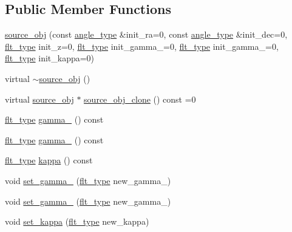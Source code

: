 \subsection*{Public Member Functions}
\begin{DoxyCompactItemize}
\item 
\hyperlink{classIceBRG_1_1source__obj_a595bf7e87ae2bc9f885ac69398dc7fd6}{source\+\_\+obj} (const \hyperlink{namespaceIceBRG_a688eeb0811a2474b20b667ed2e9625a1}{angle\+\_\+type} \&init\+\_\+ra=0, const \hyperlink{namespaceIceBRG_a688eeb0811a2474b20b667ed2e9625a1}{angle\+\_\+type} \&init\+\_\+dec=0, \hyperlink{lib_2IceBRG__main_2common_8h_ad0f130a56eeb944d9ef2692ee881ecc4}{flt\+\_\+type} init\+\_\+z=0, \hyperlink{lib_2IceBRG__main_2common_8h_ad0f130a56eeb944d9ef2692ee881ecc4}{flt\+\_\+type} init\+\_\+gamma\+\_=0, \hyperlink{lib_2IceBRG__main_2common_8h_ad0f130a56eeb944d9ef2692ee881ecc4}{flt\+\_\+type} init\+\_\+gamma\+\_=0, \hyperlink{lib_2IceBRG__main_2common_8h_ad0f130a56eeb944d9ef2692ee881ecc4}{flt\+\_\+type} init\+\_\+kappa=0)
\item 
virtual \hyperlink{classIceBRG_1_1source__obj_aefcc60368231b021fe8166f98311e1d6}{$\sim$source\+\_\+obj} ()
\item 
virtual \hyperlink{classIceBRG_1_1source__obj}{source\+\_\+obj} $\ast$ \hyperlink{classIceBRG_1_1source__obj_a0c5bd9f6b0fa086c18c3918fcc6a5fac}{source\+\_\+obj\+\_\+clone} () const  =0
\item 
\hyperlink{lib_2IceBRG__main_2common_8h_ad0f130a56eeb944d9ef2692ee881ecc4}{flt\+\_\+type} \hyperlink{classIceBRG_1_1source__obj_a3cac72eb3217867d24a80af6be00e253}{gamma\+\_} () const 
\item 
\hyperlink{lib_2IceBRG__main_2common_8h_ad0f130a56eeb944d9ef2692ee881ecc4}{flt\+\_\+type} \hyperlink{classIceBRG_1_1source__obj_a19792a6ae7f359962d3d4256c0b6482f}{gamma\+\_} () const 
\item 
\hyperlink{lib_2IceBRG__main_2common_8h_ad0f130a56eeb944d9ef2692ee881ecc4}{flt\+\_\+type} \hyperlink{classIceBRG_1_1source__obj_ab25974cd9f5cf78de04e4e8afa1256de}{kappa} () const 
\item 
void \hyperlink{classIceBRG_1_1source__obj_af6aaf2d3569b3f87f7755e28c289d114}{set\+\_\+gamma\+\_} (\hyperlink{lib_2IceBRG__main_2common_8h_ad0f130a56eeb944d9ef2692ee881ecc4}{flt\+\_\+type} new\+\_\+gamma\+\_)
\item 
void \hyperlink{classIceBRG_1_1source__obj_a7ce0ece56cc848b4c30ade88121f1819}{set\+\_\+gamma\+\_} (\hyperlink{lib_2IceBRG__main_2common_8h_ad0f130a56eeb944d9ef2692ee881ecc4}{flt\+\_\+type} new\+\_\+gamma\+\_)
\item 
void \hyperlink{classIceBRG_1_1source__obj_a678744c9b44a26b43c41559a5f5200da}{set\+\_\+kappa} (\hyperlink{lib_2IceBRG__main_2common_8h_ad0f130a56eeb944d9ef2692ee881ecc4}{flt\+\_\+type} new\+\_\+kappa)
\end{DoxyCompactItemize}


